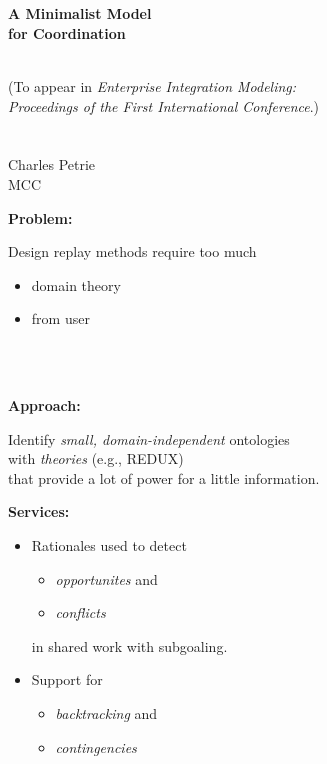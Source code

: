 \addtolength{\oddsidemargin}{-.75in}
\addtolength{\evensidemargin}{-.75in}
\addtolength{\textwidth}{1.5in}
\addtolength{\topmargin}{-1.0in}
\addtolength{\textheight}{2.0in}
\setlength{\parindent}{0in}
\setlength{\parskip}{2\baselineskip}




\begin{LARGE}
\mbox{}\\
\begin{center}
\mbox{}\\

{\bf A Minimalist Model\\ for Coordination}

\mbox{}\\
{\Large (To appear in
{\it Enterprise Integration Modeling:\\
Proceedings of  the First International Conference}.)}
\mbox{}\\
\mbox{}\\
\mbox{}\\
 Charles Petrie\\  MCC\\
\end{center}


\newpage
\begin{center}
{\bf Problem:}
\end{center}

\noindent
Design replay methods require too much 
\begin{itemize}
\item domain theory
\item from user
\end{itemize}
\mbox{}\\
\mbox{}\\

\begin{center}
{\bf Approach:}
\end{center}

\noindent
Identify {\it small, domain-independent} ontologies\\ with {\it
theories} (e.g., REDUX) \\that provide a lot of power for a little
information.


\newpage
\begin{center}
{\bf Services:}
\end{center}

\begin{itemize}
\item Rationales used to detect 
 \begin{itemize}
 \item {\it opportunites} and 
 \item {\it conflicts} 
 \end{itemize}
in shared work with subgoaling.
\item Support for 
 \begin{itemize}
 \item {\it backtracking} and 
 \item {\it contingencies}
 \end{itemize}
\end{itemize}
\mbox{}\\



\end{LARGE}
